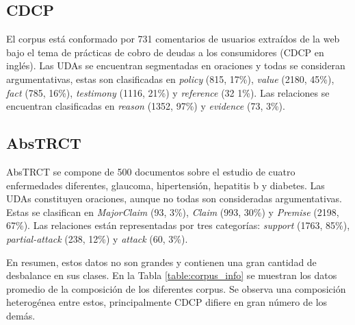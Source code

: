 \documentclass[a4paper,11pt,twocolumn,twoside]{article}
\begin{document}
\subsection{CDCP}\label{corpus:cdcp}

El corpus \cite{niculae2017argument} está conformado por 731 comentarios de usuarios extraídos de la web bajo el tema de 
prácticas de cobro de deudas a los consumidores (CDCP en inglés).
Las UDAs se encuentran segmentadas en oraciones y todas se consideran argumentativas, estas son clasificadas en 
\textit{policy} (815, 17\%), \textit{value} (2180, 45\%), \textit{fact} (785, 16\%), \textit{testimony} (1116, 21\%) y \textit{reference} (32 1\%). 
Las relaciones se encuentran clasificadas en \textit{reason} (1352, 97\%) y \textit{evidence} (73, 3\%).

\subsection{AbsTRCT}

AbsTRCT \cite{mayer2020transformer} se compone de 500 documentos sobre el estudio de cuatro enfermedades diferentes,
glaucoma, hipertensión, hepatitis b y diabetes. Las UDAs constituyen oraciones, aunque no todas son consideradas
argumentativas. Estas se clasifican en \textit{MajorClaim} (93, 3\%), \textit{Claim} (993, 30\%) y \textit{Premise} (2198, 67\%).
Las relaciones están representadas por tres categorías: \textit{support} (1763, 85\%), \textit{partial-attack} (238, 12\%) y
\textit{attack} (60, 3\%).

En resumen, estos datos no son grandes y contienen una gran cantidad de desbalance en sus clases.
En la Tabla \ref{table:corpus_info} se muestran los datos promedio de la composición de los diferentes corpus. 
Se observa una composición heterogénea entre estos, principalmente CDCP difiere en gran número de los demás.
\end{document}
